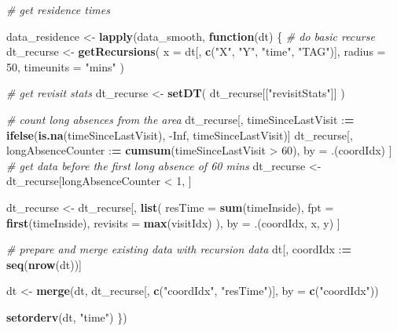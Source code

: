 \documentclass[
]{scrartcl}
\newenvironment{Shaded}{}{}
\newcommand{\CommentTok}[1]{\textcolor[rgb]{0.38,0.63,0.69}{\textit{#1}}}
\newcommand{\ControlFlowTok}[1]{\textcolor[rgb]{0.00,0.44,0.13}{\textbf{#1}}}
\newcommand{\DataTypeTok}[1]{\textcolor[rgb]{0.56,0.13,0.00}{#1}}
\newcommand{\DecValTok}[1]{\textcolor[rgb]{0.25,0.63,0.44}{#1}}
\newcommand{\ErrorTok}[1]{\textcolor[rgb]{1.00,0.00,0.00}{\textbf{#1}}}
\newcommand{\KeywordTok}[1]{\textcolor[rgb]{0.00,0.44,0.13}{\textbf{#1}}}
\newcommand{\NormalTok}[1]{#1}
\newcommand{\OperatorTok}[1]{\textcolor[rgb]{0.40,0.40,0.40}{#1}}
\newcommand{\OtherTok}[1]{\textcolor[rgb]{0.00,0.44,0.13}{#1}}
\newcommand{\StringTok}[1]{\textcolor[rgb]{0.25,0.44,0.63}{#1}}
\begin{document}
\begin{Shaded}
\begin{Highlighting}[]
\CommentTok{\# get residence times}

\NormalTok{data\_residence <{-}}\StringTok{ }\KeywordTok{lapply}\NormalTok{(data\_smooth, }\ControlFlowTok{function}\NormalTok{(dt) \{}
  \CommentTok{\# do basic recurse}
\NormalTok{  dt\_recurse <{-}}\StringTok{ }\KeywordTok{getRecursions}\NormalTok{(}
    \DataTypeTok{x =}\NormalTok{ dt[, }\KeywordTok{c}\NormalTok{(}\StringTok{"X"}\NormalTok{, }\StringTok{"Y"}\NormalTok{, }\StringTok{"time"}\NormalTok{, }\StringTok{"TAG"}\NormalTok{)],}
    \DataTypeTok{radius =} \DecValTok{50}\NormalTok{,}
    \DataTypeTok{timeunits =} \StringTok{"mins"}
\NormalTok{  )}
  
  \CommentTok{\# get revisit stats}
\NormalTok{  dt\_recurse <{-}}\StringTok{ }\KeywordTok{setDT}\NormalTok{(}
\NormalTok{    dt\_recurse[[}\StringTok{"revisitStats"}\NormalTok{]]}
\NormalTok{  )}
  
  \CommentTok{\# count long absences from the area}
\NormalTok{  dt\_recurse[, timeSinceLastVisit }\OperatorTok{:}\ErrorTok{=}
\StringTok{          }\KeywordTok{ifelse}\NormalTok{(}\KeywordTok{is.na}\NormalTok{(timeSinceLastVisit), }\OperatorTok{{-}}\OtherTok{Inf}\NormalTok{, timeSinceLastVisit)]}
\NormalTok{  dt\_recurse[, longAbsenceCounter }\OperatorTok{:}\ErrorTok{=}\StringTok{ }\KeywordTok{cumsum}\NormalTok{(timeSinceLastVisit }\OperatorTok{>}\StringTok{ }\DecValTok{60}\NormalTok{),}
\NormalTok{             by =}\StringTok{ }\NormalTok{.(coordIdx)}
\NormalTok{             ]}
  \CommentTok{\# get data before the first long absence of 60 mins}
\NormalTok{  dt\_recurse <{-}}\StringTok{ }\NormalTok{dt\_recurse[longAbsenceCounter }\OperatorTok{<}\StringTok{ }\DecValTok{1}\NormalTok{, ]}
  
\NormalTok{  dt\_recurse <{-}}\StringTok{ }\NormalTok{dt\_recurse[, }\KeywordTok{list}\NormalTok{(}
    \DataTypeTok{resTime =} \KeywordTok{sum}\NormalTok{(timeInside),}
    \DataTypeTok{fpt =} \KeywordTok{first}\NormalTok{(timeInside),}
    \DataTypeTok{revisits =} \KeywordTok{max}\NormalTok{(visitIdx)}
\NormalTok{  ),}
\NormalTok{  by =}\StringTok{ }\NormalTok{.(coordIdx, x, y)}
\NormalTok{  ]}
  
  \CommentTok{\# prepare and merge existing data with recursion data}
\NormalTok{  dt[, coordIdx }\OperatorTok{:}\ErrorTok{=}\StringTok{ }\KeywordTok{seq}\NormalTok{(}\KeywordTok{nrow}\NormalTok{(dt))]}
  
\NormalTok{  dt <{-}}\StringTok{ }\KeywordTok{merge}\NormalTok{(dt, }
\NormalTok{              dt\_recurse[, }\KeywordTok{c}\NormalTok{(}\StringTok{"coordIdx"}\NormalTok{, }\StringTok{"resTime"}\NormalTok{)], }
              \DataTypeTok{by =} \KeywordTok{c}\NormalTok{(}\StringTok{"coordIdx"}\NormalTok{))}
  
  \KeywordTok{setorderv}\NormalTok{(dt, }\StringTok{"time"}\NormalTok{)}
\NormalTok{\})}
\end{Highlighting}
\end{Shaded}
\end{document}
